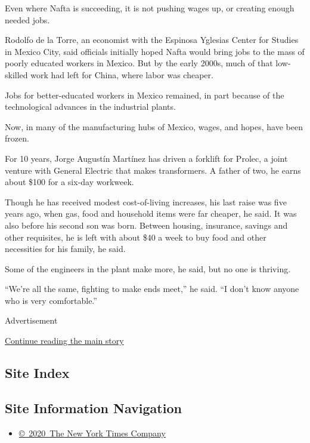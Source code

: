 Even where Nafta is succeeding, it is not pushing wages up, or creating
enough needed jobs.

Rodolfo de la Torre, an economist with the Espinosa Yglesias Center for
Studies in Mexico City, said officials initially hoped Nafta would bring
jobs to the mass of poorly educated workers in Mexico. But by the early
2000s, much of that low-skilled work had left for China, where labor was
cheaper.

Jobs for better-educated workers in Mexico remained, in part because of
the technological advances in the industrial plants.

Now, in many of the manufacturing hubs of Mexico, wages, and hopes, have
been frozen.

For 10 years, Jorge Augustín Martínez has driven a forklift for Prolec,
a joint venture with General Electric that makes transformers. A father
of two, he earns about \$100 for a six-day workweek.

Though he has received modest cost-of-living increases, his last raise
was five years ago, when gas, food and household items were far cheaper,
he said. It was also before his second son was born. Between housing,
insurance, savings and other requisites, he is left with about \$40 a
week to buy food and other necessities for his family, he said.

Some of the engineers in the plant make more, he said, but no one is
thriving.

``We're all the same, fighting to make ends meet,'' he said. ``I don't
know anyone who is very comfortable.''

Advertisement

\protect\hyperlink{after-bottom}{Continue reading the main story}

\hypertarget{site-index}{%
\subsection{Site Index}\label{site-index}}

\hypertarget{site-information-navigation}{%
\subsection{Site Information
Navigation}\label{site-information-navigation}}

\begin{itemize}
\tightlist
\item
  \href{https://help.nytimes3xbfgragh.onion/hc/en-us/articles/115014792127-Copyright-notice}{©~2020~The
  New York Times Company}
\end{itemize}


